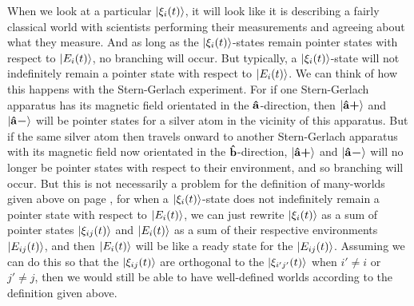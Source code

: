     When we look at a particular $\ket{\xi_i(t)}$, it will look like it is describing a fairly classical world with scientists performing their measurements and agreeing about what they measure. And as long as the $\ket{\xi_i(t)}$-states remain pointer states with respect to $\ket{E_i(t)}$, no branching will occur. But typically, a $\ket{\xi_i(t)}$-state will not indefinitely remain a pointer state with respect to $\ket{E_i(t)}$. We can think of how this happens with the Stern-Gerlach experiment. For if one Stern-Gerlach apparatus has its magnetic field orientated in the $\vb{\hat{{a}}}$-direction, then $\ket{\vb{\hat{{a}}}\bm{+}}$ and $\ket{\vb{\hat{{a}}}\bm{-}}$ will be pointer states for a silver atom in the vicinity of this apparatus. But if the same silver atom then travels onward to another Stern-Gerlach apparatus with its magnetic field now orientated in the $\vb{\hat{{b}}}$-direction, $\ket{\vb{\hat{{a}}}\bm{+}}$ and $\ket{\vb{\hat{{a}}}\bm{-}}$ will no longer be pointer states with respect to their environment, and so branching will occur. But this is not necessarily a problem for the definition of many-worlds given above on page \pageref{rigorousworld}, for when a $\ket{\xi_i(t)}$-state does not indefinitely remain a pointer state with respect to $\ket{E_i(t)}$, we can just rewrite $\ket{\xi_i(t)}$ as a sum of pointer states $\ket{\xi_{ij}(t)}$ and $\ket{E_i(t)}$  as a sum of their respective environments $\ket{E_{ij}(t)}$, and then $\ket{E_i(t)}$ will be like a ready state for the $\ket{E_{ij}(t)}$. Assuming we can do this so that the $\ket{\xi_{ij}(t)}$ are orthogonal to the $\ket{\xi_{i'j'}(t)}$ when $i'\neq i$ or $j'\neq j$, then we would still be able to have well-defined worlds according to the definition given above.
   